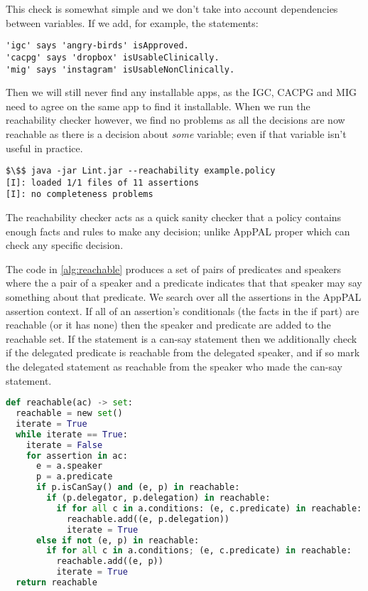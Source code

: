 \documentclass[a4paper]{scrartcl}
\begin{document}
This check is somewhat simple and we don't take into account dependencies
between variables.  If we add, for example, the statements:

\begin{lstlisting}
'igc' says 'angry-birds' isApproved.
'cacpg' says 'dropbox' isUsableClinically.
'mig' says 'instagram' isUsableNonClinically.
\end{lstlisting}

Then we will still never find any installable apps, as the IGC, CACPG and MIG
need to agree on the same app to find it installable.  When we run the
reachability checker however, we find no problems as all the decisions are now
reachable as there is a decision about \emph{some} variable; even if that
variable isn't useful in practice.

\begin{lstlisting}
$\$$ java -jar Lint.jar --reachability example.policy
[I]: loaded 1/1 files of 11 assertions
[I]: no completeness problems
\end{lstlisting}

The reachability checker acts as a quick sanity checker that a policy contains
enough facts and rules to make any decision; unlike AppPAL proper which can
check any specific decision.

The code in \autoref{alg:reachable} produces a set of pairs of predicates and
speakers where the a pair of a speaker and a predicate indicates that that
speaker may say something about that predicate. We search over all the
assertions in the AppPAL assertion context. If all of an assertion's
conditionals (the facts in the if part) are reachable (or it has none) then the
speaker and predicate are added to the reachable set. If the statement is a
can-say statement then we additionally check if the delegated predicate is
reachable from the delegated speaker, and if so mark the delegated statement as
reachable from the speaker who made the can-say statement.

\begin{lstlisting}[language=Python,float,caption={Procedure for finding all reachable assertions.},label={alg:reachable}]
def reachable(ac) -> set:
  reachable = new set()
  iterate = True
  while iterate == True:
    iterate = False
    for assertion in ac:
      e = a.speaker
      p = a.predicate
      if p.isCanSay() and (e, p) in reachable:
        if (p.delegator, p.delegation) in reachable:
          if for all c in a.conditions: (e, c.predicate) in reachable:
            reachable.add((e, p.delegation))
            iterate = True
      else if not (e, p) in reachable:
        if for all c in a.conditions; (e, c.predicate) in reachable:
          reachable.add((e, p))
          iterate = True
  return reachable
\end{lstlisting}
\end{document}
